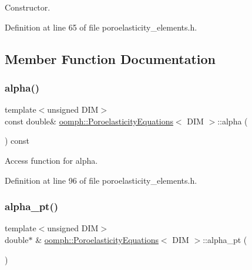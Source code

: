 Constructor. 



Definition at line 65 of file poroelasticity\+\_\+elements.\+h.



\subsection{Member Function Documentation}
\mbox{\label{classoomph_1_1PoroelasticityEquations_a3f9dc2e08ec6df6ac5b7e57713cad5ec}} 
\subsubsection{\texorpdfstring{alpha()}{alpha()}}
{\footnotesize\ttfamily template$<$unsigned D\+IM$>$ \\
const double\& \hyperlink{classoomph_1_1PoroelasticityEquations}{oomph\+::\+Poroelasticity\+Equations}$<$ D\+IM $>$\+::alpha (\begin{DoxyParamCaption}{ }\end{DoxyParamCaption}) const\hspace{0.3cm}{\ttfamily [inline]}}



Access function for alpha. 



Definition at line 96 of file poroelasticity\+\_\+elements.\+h.

\mbox{\label{classoomph_1_1PoroelasticityEquations_a89814dc03d315008e96f026dd66524bf}} 
\subsubsection{\texorpdfstring{alpha\+\_\+pt()}{alpha\_pt()}}
{\footnotesize\ttfamily template$<$unsigned D\+IM$>$ \\
double$\ast$ \& \hyperlink{classoomph_1_1PoroelasticityEquations}{oomph\+::\+Poroelasticity\+Equations}$<$ D\+IM $>$\+::alpha\+\_\+pt (\begin{DoxyParamCaption}{ }\end{DoxyParamCaption})\hspace{0.3cm}{\ttfamily [inline]}}



